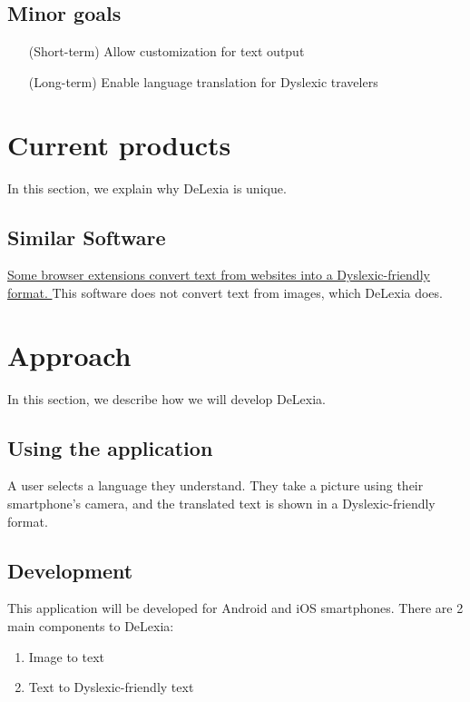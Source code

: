 \documentclass[a4paper]{article}
\begin{document}
\subsection{Minor goals}

\begin{itemize}
  \setlength{\itemindent}{8em}
   \item[(Short-term)] Allow customization for text output
   \item[(Long-term)] Enable language translation for Dyslexic travelers
\end{itemize}



\section{Current products}
In this section, we explain why DeLexia is unique.

\subsection{Similar Software}
\href{https://chrome.google.com/webstore/detail/dyslexia-reader-chrome/npfbahgomodenajejiopcfbggcpkcani}{Some browser extensions convert text from websites into a Dyslexic-friendly format.
}
This software does not convert text from images, which DeLexia does. 

\newpage



\section{Approach}
In this section, we describe how we will develop DeLexia.

\subsection{Using the application}
A user selects a language they understand. They take a picture using their smartphone's camera, and the translated text is shown in a Dyslexic-friendly format. 


\subsection{Development}
This application will be developed for Android and iOS smartphones.
There are 2 main components to DeLexia: 

\begin{enumerate}
\item Image to text
\item Text to Dyslexic-friendly text
\end{enumerate}
\end{document}
